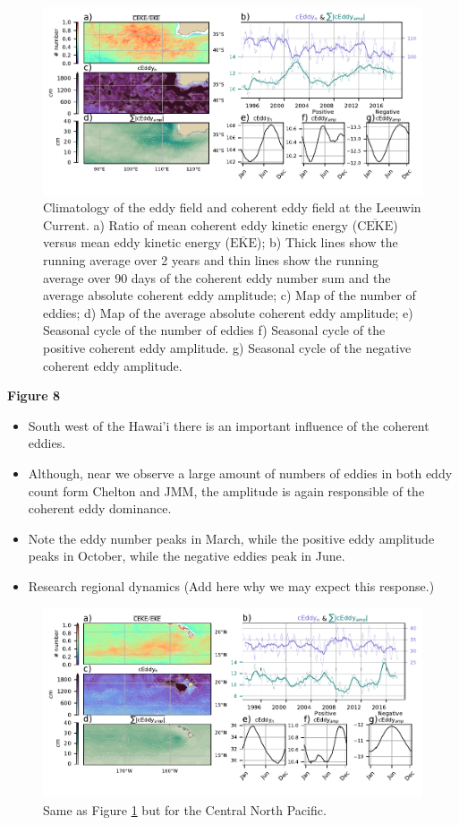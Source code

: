 \documentclass[draft,linenumbers]{agujournal2019}
\newcommand{\MEKE}{\overline{\textrm{EKE}}}
\newcommand{\MCEKE}{\overline{\textrm{CEKE}}}
\begin{document}
	\begin{figure}
	    \centering
	    \includegraphics[width=1\textwidth]{figures/regional_ratios_and_stats_V3_0.pdf}
	    \caption{ Climatology of the eddy field and coherent eddy field at the Leeuwin Current. a) Ratio of mean coherent eddy kinetic energy ($\MCEKE$) versus mean eddy kinetic energy ($\MEKE$); b) Thick lines show the running average over 2 years and thin lines show the running average over 90 days of the coherent eddy number sum and the average absolute coherent eddy amplitude; c) Map of the number of eddies; d) Map of the average absolute coherent eddy amplitude; e) Seasonal cycle of the number of eddies f) Seasonal cycle of the positive coherent eddy amplitude. g) Seasonal cycle of the negative coherent eddy amplitude.}
	    \label{fig:leeuwin_cycle}
	\end{figure}

	\textbf{Figure 8}
	\begin{itemize}
		\item South west of the Hawai'i there is an important influence of the coherent eddies.
		\item Although, near we observe a large amount of numbers of eddies in both eddy count form Chelton and JMM, the amplitude is again responsible of the coherent eddy dominance. 
		\item Note the eddy number peaks in March, while the positive eddy amplitude peaks in October, while the negative eddies peak in June.
		\item Research regional dynamics (Add here why we may expect this response.)
	\end{itemize}

	\begin{figure}
	    \centering
	    \includegraphics[width=1\textwidth]{figures/regional_ratios_and_stats_V3_1.pdf}
	    \caption{Same as Figure \ref{fig:leeuwin_cycle} but for the Central North Pacific.}
	    \label{fig:east_tropical_cycle}
	\end{figure}
\end{document}
